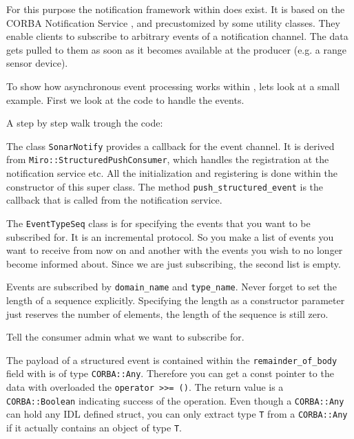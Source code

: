 For this purpose the notification framework within \miro does
exist. It is based on the CORBA Notification Service
\cite{OMG:00-5}, and precustomized by some utility classes. They
enable clients to subscribe to arbitrary events of a notification
channel. The data gets pulled to them as soon as it becomes
available at the producer (e.g. a range sensor device).

To show how asynchronous event processing works within \miro, lets
look at a small example. First we look at the code to handle the
events.


\label{lst:SonarNotify}

A step by step walk trough the code:



The class \lstinline!SonarNotify! provides a callback for the event
channel. It is derived from \lstinline!Miro::StructuredPushConsumer!,
which handles the registration at the notification service etc. All
the initialization and registering is done within the constructor of
this super class. The method \lstinline!push_structured_event! is the
callback that is called from the notification service.



The \lstinline!EventTypeSeq! class is for specifying the events that you
want to be subscribed for. It is an incremental protocol. So you make
a list of events you want to receive from now on and another with the
events you wish to no longer become informed about. Since we are just
subscribing, the second list is empty.



Events are subscribed by \lstinline!domain_name! and
\lstinline!type_name!. Never forget to set the length of a
sequence explicitly. Specifying the length as a constructor
parameter just reserves the number of elements, the length of the
sequence is still zero.



Tell the consumer admin what we want to subscribe for.



The payload of a structured event is contained within the
\lstinline!remainder_of_body! field with is of type
\lstinline!CORBA::Any!.  Therefore you can get a const pointer to the
data with overloaded the \lstinline!operator >>= ()!. The return value
is a \lstinline!CORBA::Boolean! indicating success of the operation.
Even though a \lstinline!CORBA::Any! can hold any IDL defined struct,
you can only extract type \lstinline!T! from a \lstinline!CORBA::Any!
if it actually contains an object of type \lstinline!T!.

